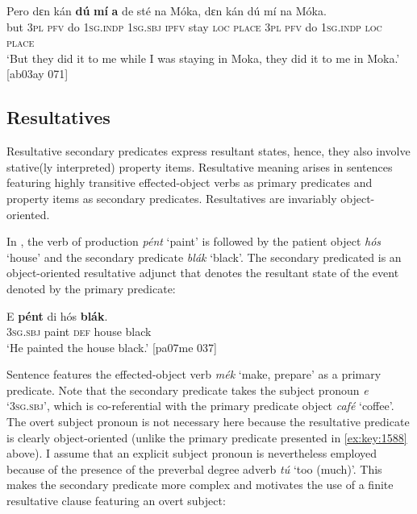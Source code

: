 \ea%
    \label{ex:key:1601}
    \gll Pero    dɛn  kán  \textbf{dú}  \textbf{mí}    \textbf{a}    de  sté  na  Móka,  
dɛn  kán  dú  mí    na  Móka.\\
but    \textsc{3pl}  \textsc{pfv}  do  \textsc{1sg.indp}  \textsc{1sg.sbj}  \textsc{ipfv}  stay  \textsc{loc}  \textsc{place}  
\textsc{3pl}  \textsc{pfv}  do  \textsc{1sg.indp}  \textsc{loc}  \textsc{place}\\

\glt ‘But they did it to me while I was staying in Moka, they did it to 
me in Moka.’ [ab03ay 071]
\z

\subsection{Resultatives}\label{sec:11.3.3}

Resultative secondary predicates express resultant states, hence, they also involve stative(ly interpreted) property items. Resultative meaning arises in sentences featuring highly transitive effected-object verbs\index{} as primary predicates and property items as secondary predicates. Resultatives are invariably object-oriented.


In , the verb of production \textit{pént} ‘paint’ is followed by the patient object \textit{hós} ‘house’ and the secondary predicate \textit{blák} ‘black’. The secondary predicated is an object-oriented resultative adjunct that denotes the resultant state of the event denoted by the primary predicate:



\ea%
    \label{ex:key:1602}
    \gll E    \textbf{pént}  di  hós    \textbf{blák}.\\
\textsc{3sg.sbj}  paint  \textsc{def}  house  black\\

\glt ‘He painted the house black.’ [pa07me 037]
\z

Sentence  features the effected-object verb\is{} \textit{mék} ‘make, prepare’ as a primary predicate. Note that the secondary predicate takes the subject pronoun \textit{e} ‘\textsc{3sg.sbj}’, which is co-referential with the primary predicate object \textit{café} ‘coffee’. The overt subject pronoun is not necessary here because the resultative predicate is clearly object-oriented (unlike the primary predicate presented in \ref{ex:key:1588} above). I assume that an explicit subject pronoun is nevertheless employed because of the presence of the preverbal degree adverb \textit{tú} ‘too (much)’. This makes the secondary predicate more complex and motivates the use of a finite resultative clause featuring an overt subject: 


